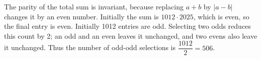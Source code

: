 The parity of the total sum is invariant, because replacing $a+b$ by $|a-b|$ changes it by an even number. Initially the sum is $1012\cdot2025$, which is even, so the final entry is even. Initially 1012 entries are odd. Selecting two odds reduces this count by 2; an odd and an even leaves it unchanged, and two evens also leave it unchanged. Thus the number of odd-odd selections is $\dfrac{1012}{2}=\boxed{506}$.
